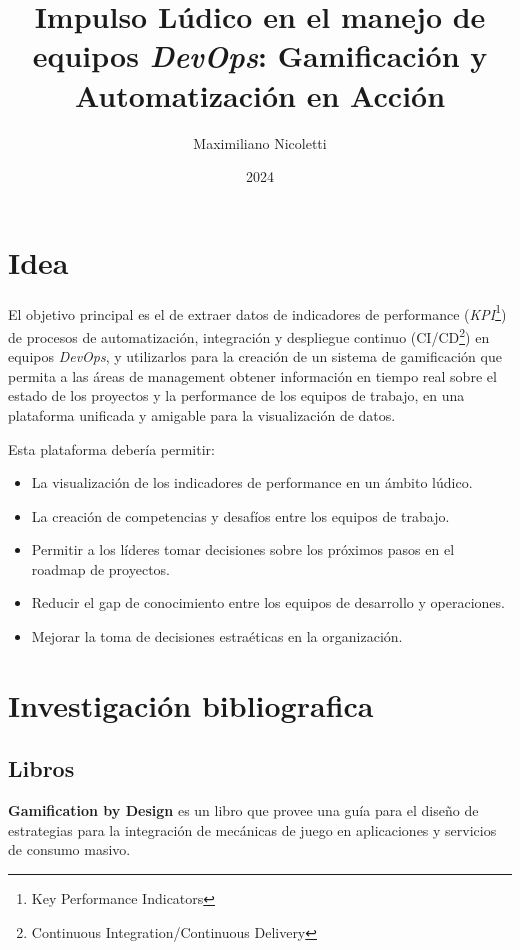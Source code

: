 \documentclass[journal]{IEEEtran}
\begin{document}
\title{Impulso Lúdico en el manejo de equipos \textit{DevOps}: Gamificación y Automatización en Acción}

\author{Maximiliano Nicoletti}

\date{2024}

\maketitle

\section{\textbf{\Large Idea}}

El objetivo principal es el de extraer datos de indicadores de performance (\textit{KPI}\footnote{Key Performance Indicators}) de procesos de automatización, integración y despliegue continuo (CI/CD\footnote{Continuous Integration/Continuous Delivery}) en equipos \textit{DevOps}, y utilizarlos para la creación de un sistema de gamificación que permita a las áreas de management obtener información en tiempo real sobre el estado de los proyectos y la performance de los equipos de trabajo, en una plataforma unificada y amigable para la visualización de datos.

Esta plataforma debería permitir:
\begin{itemize}
    \item La visualización de los indicadores de performance en un ámbito lúdico.
    \item La creación de competencias y desafíos entre los equipos de trabajo.
    \item Permitir a los líderes tomar decisiones sobre los próximos pasos en el roadmap de proyectos.
    \item Reducir el gap de conocimiento entre los equipos de desarrollo y operaciones.
    \item Mejorar la toma de decisiones estraéticas en la organización.
\end{itemize}

\section{\textbf{\Large Investigación bibliografica}}
\subsection{\textbf{\large Libros}}

\cite{zichermann2011gamification} \textbf{Gamification by Design} es un libro que provee una guía para el diseño de estrategias para la integración de mecánicas de juego en aplicaciones y servicios de consumo masivo.
\end{document}
